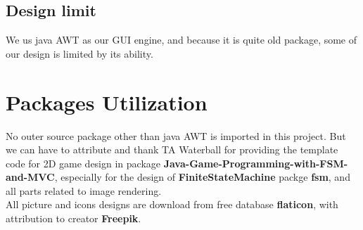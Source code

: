 \subsection{Design limit}
We us java AWT as our GUI engine, and because it is quite old package, some of our design is limited by its ability.

\section{Packages Utilization}
No outer source package other than java AWT is imported in this project. But we can have to attribute and thank TA Waterball for providing the template code for 2D game design in package \textbf{Java-Game-Programming-with-FSM-and-MVC}, especially for the design of \textbf{FiniteStateMachine} packge \textbf{fsm}, and all parts related to image rendering.\\
All picture and icons designs are download from free database \textbf{flaticon}, with attribution to creator \textbf{Freepik}.
